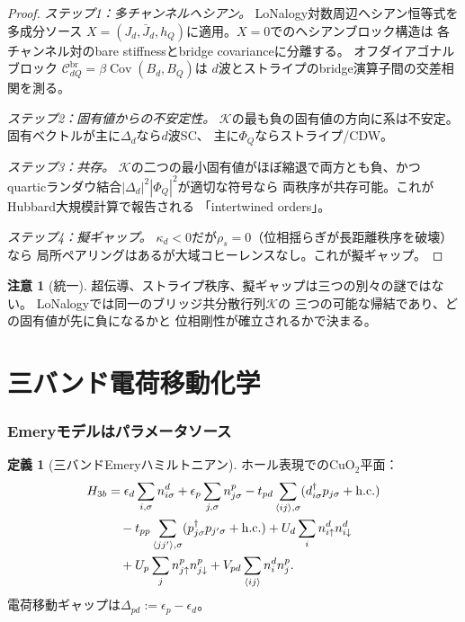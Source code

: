 \documentclass[12pt]{article}
\theoremstyle{plain}
\theoremstyle{definition}
\newtheorem{definition}[theorem]{定義}
\newtheorem{remark}[theorem]{注意}
\numberwithin{equation}{section}
\newcommand{\br}{\mathrm{br}}
\DeclareMathOperator{\Cov}{Cov}
\begin{document}
\begin{proof}
\emph{ステップ1：多チャンネルヘシアン。}
LoNalogy対数周辺ヘシアン恒等式を多成分ソース
$X=(J_d,\bar{J}_d,h_Q)$に適用。$X=0$でのヘシアンブロック構造は
各チャンネル対のbare stiffnessとbridge covarianceに分離する。
オフダイアゴナルブロック
$\mathcal{C}_{dQ}^{\br}=\beta\Cov(B_d,B_Q)$は
$d$波とストライプのbridge演算子間の交差相関を測る。

\emph{ステップ2：固有値からの不安定性。}
$\mathcal{K}$の最も負の固有値の方向に系は不安定。
固有ベクトルが主に$\Delta_d$なら$d$波SC、
主に$\Phi_Q$ならストライプ/CDW。

\emph{ステップ3：共存。}
$\mathcal{K}$の二つの最小固有値がほぼ縮退で両方とも負、かつ
quarticランダウ結合$|\Delta_d|^2|\Phi_Q|^2$が適切な符号なら
両秩序が共存可能。これがHubbard大規模計算で報告される
「intertwined orders」。

\emph{ステップ4：擬ギャップ。}
$\kappa_d<0$だが$\rho_s=0$（位相揺らぎが長距離秩序を破壊）なら
局所ペアリングはあるが大域コヒーレンスなし。これが擬ギャップ。
\end{proof}

\begin{remark}[統一]
超伝導、ストライプ秩序、擬ギャップは三つの別々の謎ではない。
LoNalogyでは同一のブリッジ共分散行列$\mathcal{K}$の
三つの可能な帰結であり、どの固有値が先に負になるかと
位相剛性が確立されるかで決まる。
\end{remark}


\part{三バンド電荷移動化学}

\section{Emeryモデルはパラメータソース}\label{sec:threeband}

\begin{definition}[三バンドEmeryハミルトニアン]
ホール表現でのCuO$_2$平面：
\begin{align}\label{eq:emery}
H_{3b} &= \epsilon_d\sum_{i,\sigma}n_{i\sigma}^d
+\epsilon_p\sum_{j,\sigma}n_{j\sigma}^p
-t_{pd}\sum_{\langle ij\rangle,\sigma}
(d_{i\sigma}^\dagger p_{j\sigma}+\mathrm{h.c.})\notag\\
&\quad -t_{pp}\sum_{\langle jj'\rangle,\sigma}
(p_{j\sigma}^\dagger p_{j'\sigma}+\mathrm{h.c.})
+U_d\sum_i n_{i\uparrow}^d n_{i\downarrow}^d\notag\\
&\quad +U_p\sum_j n_{j\uparrow}^p n_{j\downarrow}^p
+V_{pd}\sum_{\langle ij\rangle}n_i^d n_j^p.
\end{align}
電荷移動ギャップは$\Delta_{pd}:=\epsilon_p-\epsilon_d$。
\end{definition}
\end{document}
